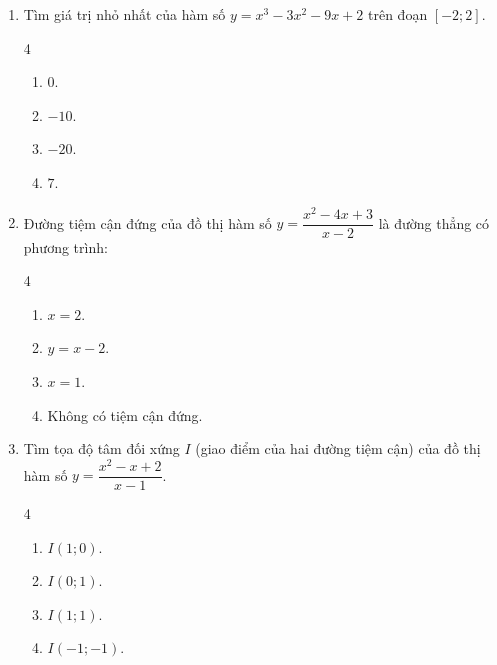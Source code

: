 \documentclass[12pt]{article}
\begin{document}
\begin{enumerate}[label=\textbf{Câu \arabic*.}, leftmargin=*]
\begin{center}
		\end{center}
		Tính giá trị của biểu thức $T = M + m$.
		\begin{multicols}{4}
			\begin{enumerate}[label=\Alph*.]
				\item $10$.
				\item $4$.
				\item $6$.
				\item $8$.
			\end{enumerate}
		\end{multicols}
		
		\item Tìm giá trị nhỏ nhất của hàm số $y = x^3 - 3x^2 - 9x + 2$ trên đoạn $[-2; 2]$.
		\begin{multicols}{4}
			\begin{enumerate}[label=\Alph*.]
				\item $0$.
				\item $-10$.
				\item $-20$.
				\item $7$.
			\end{enumerate}
		\end{multicols}
		
		\item Đường tiệm cận đứng của đồ thị hàm số $y = \dfrac{x^2 - 4x + 3}{x - 2}$ là đường thẳng có phương trình:
		\begin{multicols}{4}
			\begin{enumerate}[label=\Alph*.]
				\item $x = 2$.
				\item $y = x - 2$.
				\item $x = 1$.
				\item Không có tiệm cận đứng.
			\end{enumerate}
		\end{multicols}
		
		\item Tìm tọa độ tâm đối xứng $I$ (giao điểm của hai đường tiệm cận) của đồ thị hàm số $y = \dfrac{x^2 - x + 2}{x - 1}$.
		\begin{multicols}{4}
			\begin{enumerate}[label=\Alph*.]
				\item $I(1; 0)$.
				\item $I(0; 1)$.
				\item $I(1; 1)$.
				\item $I(-1; -1)$.
			\end{enumerate}
		\end{multicols}
		

\end{enumerate}
\end{document}
